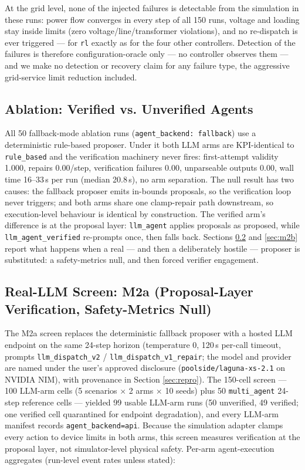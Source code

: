 \documentclass[11pt,a4paper]{article}
\newcommand{\agent}[1]{\texttt{#1}}
\begin{document}
At the grid level, none of the injected failures is detectable from the
simulation in these runs: power flow converges in every step of all 150 runs,
voltage and loading stay inside limits (zero voltage/line/transformer
violations), and no re-dispatch is ever triggered --- for \agent{rl} exactly as
for the four other controllers. Detection of the failures is therefore
configuration-oracle only --- no controller observes them --- and we make no
detection or recovery claim for any failure type, the aggressive grid-service
limit reduction included.

\subsection{Ablation: Verified vs. Unverified Agents}
\label{sec:ablation}

All 50 fallback-mode ablation runs (\texttt{agent\_backend: fallback}) use a
deterministic rule-based proposer. Under it both LLM arms are KPI-identical to
\agent{rule\_based} and the verification machinery never fires:
first-attempt validity 1.000, repairs 0.00/step, verification failures 0.00,
unparseable outputs 0.00, wall time 16--33\,s per run (median 20.8\,s), no arm
separation. The null result has two causes: the fallback proposer emits
in-bounds proposals, so the verification loop never triggers; and both arms
share one clamp-repair path downstream, so execution-level behaviour is
identical by construction. The verified arm's difference is at the proposal
layer: \agent{llm\_agent} applies proposals as proposed, while
\agent{llm\_agent\_verified} re-prompts once, then falls back. Sections
\ref{sec:m2a} and \ref{sec:m2b} report what happens when a real --- and then a
deliberately hostile --- proposer is substituted: a safety-metrics null, and
then forced verifier engagement.

\subsection{Real-LLM Screen: M2a (Proposal-Layer Verification, Safety-Metrics Null)}
\label{sec:m2a}

The M2a screen replaces the deterministic fallback proposer with a hosted LLM
endpoint on the same 24-step horizon (temperature 0, 120\,s per-call timeout,
prompts \texttt{llm\_dispatch\_v2} / \texttt{llm\_dispatch\_v1\_repair}; the model
and provider are named under the user's approved disclosure
(\texttt{poolside/laguna-xs-2.1} on NVIDIA NIM), with provenance in Section
\ref{sec:repro}). The 150-cell screen --- 100 LLM-arm cells (5 scenarios
$\times$ 2 arms $\times$ 10 seeds) plus 50 \agent{multi\_agent} 24-step
reference cells --- yielded 99 usable LLM-arm runs (50 unverified, 49 verified;
one verified cell quarantined for endpoint degradation), and every LLM-arm
manifest records \texttt{agent\_backend=api}. Because the simulation adapter
clamps every action to device limits in both arms, this screen measures
verification at the proposal layer, not simulator-level physical safety.
Per-arm agent-execution aggregates (run-level event rates unless stated):
\end{document}
